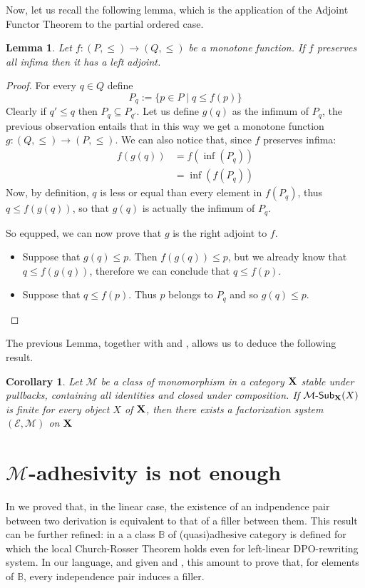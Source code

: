 \documentclass[a4paper]{article}
\newcommand{\sub}[3]{{\mathcal{#1}}\textrm{-}\mathsf{Sub}_{\textbf {\textup{#2}}}(#3)}
\def\X{\textbf {\textup{X}}}
\newtheorem{lemma}[theorem]{Lemma}
\newtheorem{corollary}[theorem]{Corollary}
\theoremstyle{definition}
\begin{document}
Now, let us recall the following lemma, which is the application of the Adjoint Functor Theorem \cite{freyd1964abelian,freyd1990categories} to the partial ordered case.

\begin{lemma}\label{lem:adj}
	Let $f\colon (P,\leq)\to (Q, \leq)$ be a monotone function. If $f$ preserves all infima then it has a left adjoint.
\end{lemma}
\begin{proof}
	For every $q\in Q$ define
	\[P_q:=\{p\in P \mid q \leq f(p)\}\]
	Clearly if $q'\leq q$ then $P_{q}\subseteq P_{q'}$. Let us define $g(q)$ as the infimum of $P_q$, the previous observation entails that in this way we get a monotone function $g\colon (Q, \leq)\to (P, \leq)$.
	We can also notice that, since $f$ preserves infima:
	\begin{align*}
		f(g(q))&=f(\inf(P_q))\\&=\inf(f(P_q))
	\end{align*}
	Now, by definition, $q$ is less or equal than every element in $f(P_q)$, thus $q\leq f(g(q))$, so that $g(q)$ is actually the infimum of $P_q$. 
	
	So equpped, we can now prove that $g$ is the right adjoint to $f$.
	\begin{itemize}
		\item Suppose that $g(q)\leq p$.  Then $f(g(q))\leq p$, but we already know that $q\leq f(g(q))$, therefore we can conclude that $q\leq f(p)$.
		\item  Suppose that $q\leq f(p)$. Thus $p$ belongs to $P_q$ and so $g(q)\leq p$. \qedhere 
	\end{itemize}
\end{proof}

The previous Lemma, together with  and , allows us to deduce the following result.

\begin{corollary}\label{cor:fin}
	Let $\mathcal{M}$ be a class of monomorphism in a category $\X$ stable under pullbacks, containing all identities and closed under composition. If $\sub{M}{X}{X}$ is finite for every object $X$ of $\X$, then there exists a factorization system $(\mathcal{E},\mathcal{M})$ on $\X$
\end{corollary}


\section{$\mathcal{M}$-adhesivity is not enough}\label{app:fill}
 In  we proved that, in the linear case, the existence of an indpendence pair between two derivation is equivalent to that of a filler between them. This result can be further refined: in a\cite{baldan2011adhesivity} a class  $\mathbb{B}$ of (quasi)adhesive category is defined for which the local Church-Rosser Theorem holds even for left-linear DPO-rewriting system. In our language, and given  and , this amount to prove that, for elements of $\mathbb{B}$, every independence pair induces a filler. 
\end{document}
